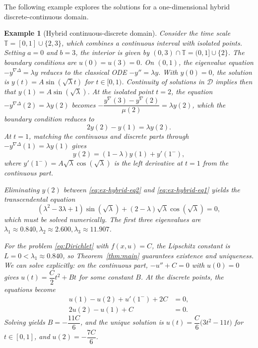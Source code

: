 \documentclass{article}
\newtheorem{example}[theorem]{Example}
\numberwithin{equation}{section}
\numberwithin{theorem}{section}
\begin{document}
The following example explores the solutions for a one-dimensional hybrid discrete-continuous domain.
\begin{example}[Hybrid continuous-discrete domain]\label{ex:hybrid}
Consider the time scale $
\mathbb{T} = [0,1] \cup \{2, 3\}$, which combines a continuous interval with isolated points. Setting $a = 0$ and $b = 3$, the interior is given by $(0,3) \cap \mathbb{T} = (0,1] \cup \{2\}$. The boundary conditions are $u(0) = u(3) = 0$. On $(0,1)$, the eigenvalue equation $-y^{\nabla\Delta} = \lambda y$ reduces to the classical ODE $-y'' = \lambda y$. With $y(0) = 0$, the solution is $y(t) = A\sin(\sqrt{\lambda} t)$ for $t \in [0,1)$. Continuity of solutions in $\mathscr{D}$ implies then that $y(1)=A\sin(\sqrt{\lambda})$. At the isolated point $t = 2$, the equation $-y^{\nabla\Delta}(2) = \lambda y(2)$ becomes
$-\dfrac{y^{\nabla}(3) - y^{\nabla}(2)}{\mu(2)} = \lambda y(2)$, which the boundary condition reduces to
\begin{equation}\label{eq:ex-hybrid-eq2}
2y(2) - y(1) = \lambda y(2).
\end{equation}
At $t = 1$, matching the continuous and discrete parts through $-y^{\nabla\Delta}(1) = \lambda y(1)$ gives
\begin{equation}\label{eq:ex-hybrid-eq1}
y(2) = (1 - \lambda)y(1) + y'(1^-),
\end{equation}
where $y'(1^-) = A\sqrt{\lambda}\cos(\sqrt{\lambda})$ is the left derivative at $t=1$ from the continuous part.

Eliminating $y(2)$ between \eqref{eq:ex-hybrid-eq2} and \eqref{eq:ex-hybrid-eq1} yields the transcendental equation
\[(\lambda^2 - 3\lambda + 1)\sin(\sqrt{\lambda}) + (2 - \lambda)\sqrt{\lambda}\cos(\sqrt{\lambda}) = 0,\]
which must be solved numerically. The first three eigenvalues are $\lambda_1 \approx 0.840, \lambda_2 \approx 2.600, \lambda_3 \approx 11.907$.

For the problem \eqref{eq:Dirichlet} with $f(x,u) = C$, the Lipschitz constant is $L = 0 < \lambda_1 \approx 0.840$, so Theorem~\ref{thm:main} guarantees existence and uniqueness. We can solve explicitly: on the continuous part, $-u'' + C = 0$ with $u(0) = 0$ gives $u(t) = \dfrac{C}{2}t^2 + Bt$ for some constant $B$. At the discrete points, the equations become
\[\begin{aligned}
u(1) - u(2) + u'(1^-) + 2C &= 0,\\
2u(2) - u(1) + C &= 0.
\end{aligned}\]
Solving yields $B = -\dfrac{11C}{6}$, and the unique solution is 
$u(t) = \dfrac{C}{6}\big(3t^2 - 11t\big)$ for $t \in [0,1]$, and $u(2) = -\dfrac{7C}{6}$.


\end{example}
\end{document}
